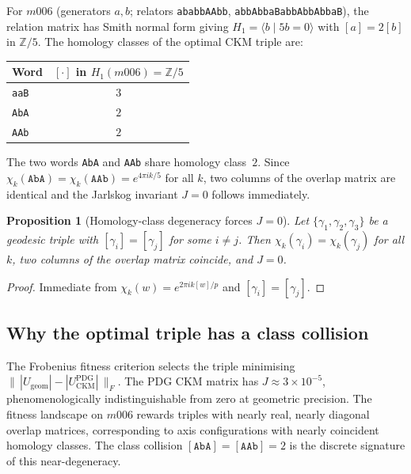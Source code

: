 ﻿\documentclass[12pt]{article}
\newtheorem{proposition}[theorem]{Proposition}
\theoremstyle{definition}
\begin{document}
For $m006$ (generators $a,b$; relators \texttt{ababbAAbb},
\texttt{abbAbbaBabbAbbAbbaB}), the relation matrix has Smith normal form
giving $H_1 = \langle b\mid 5b=0\rangle$ with $[a]=2[b]$ in $\mathbb{Z}/5$.
The homology classes of the optimal CKM triple are:
\begin{center}\small
\begin{tabular}{lc}
\toprule
Word & $[\cdot]$ in $H_1(m006)=\mathbb{Z}/5$ \\
\midrule
\texttt{aaB} & $3$ \\
\texttt{AbA} & $2$ \\
\texttt{AAb} & $2$ \\
\bottomrule
\end{tabular}
\end{center}

The two words \texttt{AbA} and \texttt{AAb} share homology class~$2$.
Since $\chi_k(\texttt{AbA})=\chi_k(\texttt{AAb})=e^{4\pi ik/5}$ for all $k$,
two columns of the overlap matrix are identical and the Jarlskog
invariant $J=0$ follows immediately.

\begin{proposition}[Homology-class degeneracy forces $J=0$]
\label{prop:hom_class}
Let $\{\gamma_1,\gamma_2,\gamma_3\}$ be a geodesic triple with
$[\gamma_i]=[\gamma_j]$ for some $i\neq j$.
Then $\chi_k(\gamma_i)=\chi_k(\gamma_j)$ for all $k$,
two columns of the overlap matrix coincide, and $J=0$.
\end{proposition}

\begin{proof}
Immediate from $\chi_k(w)=e^{2\pi ik[w]/p}$ and $[\gamma_i]=[\gamma_j]$.
\end{proof}

\subsection{Why the optimal triple has a class collision}

The Frobenius fitness criterion selects the triple minimising
$\|\,|U_\text{geom}|-|U_\text{CKM}^\text{PDG}|\,\|_F$.
The PDG CKM matrix has $J\approx 3\times 10^{-5}$, phenomenologically
indistinguishable from zero at geometric precision.
The fitness landscape on $m006$ rewards triples with nearly real,
nearly diagonal overlap matrices, corresponding to axis configurations
with nearly coincident homology classes.
The class collision $[\texttt{AbA}]=[\texttt{AAb}]=2$ is the discrete
signature of this near-degeneracy.
\end{document}
